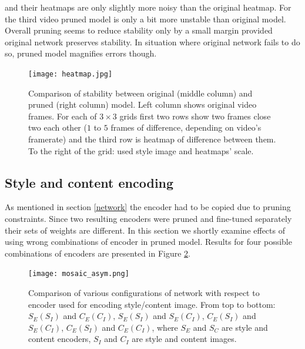 \documentclass[../Main.tex]{subfiles}
\begin{document}
and their heatmaps are only slightly more noisy than the original heatmap.
For the third video pruned model is only a bit more unstable than original model.
Overall pruning seems to reduce stability only by a small margin provided original network
preserves stability. In situation where original network fails to do so, pruned model
magnifies errors though.
\begin{figure}[ht!]
\centering
    \texttt{[image: heatmap.jpg]}
    \caption{Comparison of stability between original (middle column) and pruned
    (right column) model. Left column shows original video frames. For each of
    $3\times3$ grids first two rows show two frames close two each other
    ($1$ to $5$ frames of difference, depending on video's framerate) and the third
    row is heatmap of difference between them. To the right of the grid: used style
    image and heatmaps' scale.
    }
    \label{fig:heatmap}
\end{figure} 



\subsection{Style and content encoding} \label{two_encoders}
As mentioned in section \ref{network} the encoder had to be copied due to pruning
constraints. Since two resulting encoders were pruned and fine-tuned separately 
their sets of weights are different. In this section we shortly examine effects
of using wrong combinations of encoder in pruned model. Results for four possible combinations
of encoders are presented in Figure \ref{fig:mosaic_asym}.

        \begin{figure}[ht!]
        \centering
            \texttt{[image: mosaic\_asym.png]}
            \caption{Comparison of various configurations of network with respect
            to encoder used for encoding style/content image. From top to bottom:
            $S_E(S_I)$ and $C_E(C_I)$, $S_E(S_I)$ and $S_E(C_I)$,
            $C_E(S_I)$ and $S_E(C_I)$, $C_E(S_I)$ and $C_E(C_I)$, where
            $S_E$ and $S_C$ are style and content encoders, $S_I$ and $C_I$ are 
            style and content images.
            }
            \label{fig:mosaic_asym}
        \end{figure}
        
\end{document}
